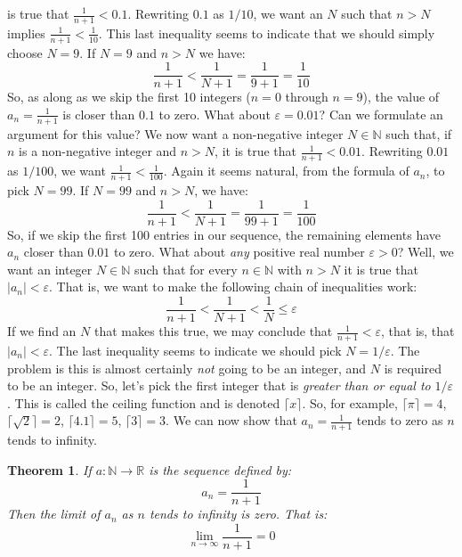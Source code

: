 \documentclass{article}
\theoremstyle{normal}
\theoremstyle{plain}
\newtheorem{theorem}{Theorem}
\newcommand{\ceil}[2][]{#1\lceil#2#1\rceil}
\begin{document}
    is true that $\frac{1}{n+1}<0.1$. Rewriting $0.1$ as $1/10$, we want an
    $N$ such that $n>N$ implies $\frac{1}{n+1}<\frac{1}{10}$. This last
    inequality seems to indicate that we should simply choose $N=9$. If
    $N=9$ and $n>N$ we have:
    \begin{equation}
        \frac{1}{n+1}<\frac{1}{N+1}=\frac{1}{9+1}=\frac{1}{10}
    \end{equation}
    So, as along as we skip the first 10 integers ($n=0$ through $n=9$), the
    value of $a_{n}=\frac{1}{n+1}$ is closer than $0.1$ to zero. What about
    $\varepsilon=0.01$? Can we formulate an argument for this value? We now
    want a non-negative integer $N\in\mathbb{N}$ such that, if $n$ is a
    non-negative integer and $n>N$, it is true that
    $\frac{1}{n+1}<0.01$. Rewriting $0.01$ as $1/100$, we want
    $\frac{1}{n+1}<\frac{1}{100}$. Again it seems natural, from the formula of
    $a_{n}$, to pick $N=99$. If $N=99$ and $n>N$, we have:
    \begin{equation}
        \frac{1}{n+1}<\frac{1}{N+1}=\frac{1}{99+1}=\frac{1}{100}
    \end{equation}
    So, if we skip the first 100 entries in our sequence, the remaining
    elements have $a_{n}$ closer than $0.01$ to zero. What about
    \textit{any} positive real number $\varepsilon>0$? Well, we want an
    integer $N\in\mathbb{N}$ such that for every $n\in\mathbb{N}$ with $n>N$
    it is true that $|a_{n}|<\varepsilon$. That is, we want to make the
    following chain of inequalities work:
    \begin{equation}
        \frac{1}{n+1}<\frac{1}{N+1}<\frac{1}{N}\leq\varepsilon
    \end{equation}
    If we find an $N$ that makes this true, we may conclude that
    $\frac{1}{n+1}<\varepsilon$, that is, that $|a_{n}|<\varepsilon$. The
    last inequality seems to indicate we should pick $N=1/\varepsilon$. The
    problem is this is almost certainly \textit{not} going to be an integer,
    and $N$ is required to be an integer. So, let's pick the first integer that
    is \textit{greater than or equal to} $1/\varepsilon$. This is called the
    ceiling function and is denoted $\ceil{x}$. So, for example,
    $\ceil{\pi}=4$, $\ceil{\sqrt{2}}=2$, $\ceil{4.1}=5$, $\ceil{3}=3$. We can
    now show that $a_{n}=\frac{1}{n+1}$ tends to zero as $n$ tends to infinity.
    \begin{theorem}
        If $a:\mathbb{N}\rightarrow\mathbb{R}$ is the sequence defined by:
        \begin{equation}
            a_{n}=\frac{1}{n+1}
        \end{equation}
        Then the limit of $a_{n}$ as $n$ tends to infinity is zero. That is:
        \begin{equation}
            \lim_{n\rightarrow\infty}\frac{1}{n+1}=0
        \end{equation}
    \end{theorem}
\end{document}
